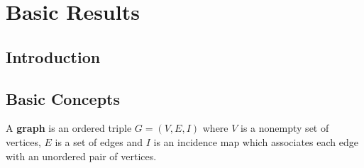 

\section{Basic Results}
\subsection{Introduction}
\cite{balakrishnan}
\subsection{Basic Concepts}
\begin{definition}
	A \textbf{graph} is an ordered triple $G = (V,E,I)$ where $V$ is a nonempty set of vertices, $E$ is a set of edges and $I$ is an incidence map which associates each edge with an unordered pair of vertices.
\end{definition}

